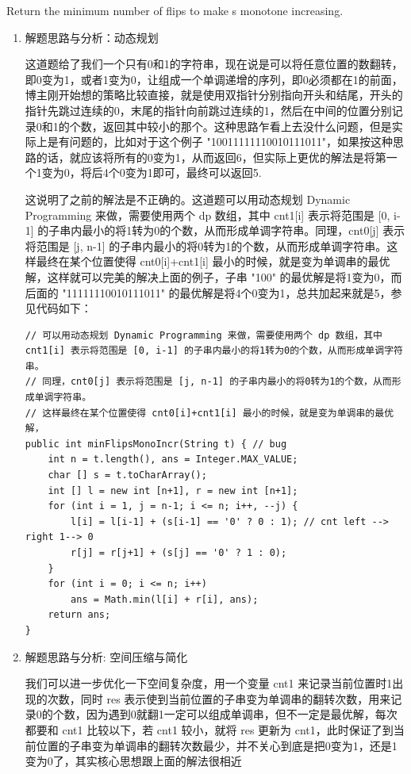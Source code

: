 \documentclass[9pt, b5paaper]{book}
\begin{document}
Return the minimum number of flips to make s monotone increasing.
\begin{enumerate}
\item 解题思路与分析：动态规划
\label{sec-1-4-23-1}

这道题给了我们一个只有0和1的字符串，现在说是可以将任意位置的数翻转，即0变为1，或者1变为0，让组成一个单调递增的序列，即0必须都在1的前面，博主刚开始想的策略比较直接，就是使用双指针分别指向开头和结尾，开头的指针先跳过连续的0，末尾的指针向前跳过连续的1，然后在中间的位置分别记录0和1的个数，返回其中较小的那个。这种思路乍看上去没什么问题，但是实际上是有问题的，比如对于这个例子 "10011111110010111011"，如果按这种思路的话，就应该将所有的0变为1，从而返回6，但实际上更优的解法是将第一个1变为0，将后4个0变为1即可，最终可以返回5.

这说明了之前的解法是不正确的。这道题可以用动态规划 Dynamic Programming 来做，需要使用两个 dp 数组，其中 cnt1[i] 表示将范围是 [0, i-1] 的子串内最小的将1转为0的个数，从而形成单调字符串。同理，cnt0[j] 表示将范围是 [j, n-1] 的子串内最小的将0转为1的个数，从而形成单调字符串。这样最终在某个位置使得 cnt0[i]+cnt1[i] 最小的时候，就是变为单调串的最优解，这样就可以完美的解决上面的例子，子串 "100" 的最优解是将1变为0，而后面的 "11111110010111011" 的最优解是将4个0变为1，总共加起来就是5，参见代码如下：

\begin{verbatim}
// 可以用动态规划 Dynamic Programming 来做，需要使用两个 dp 数组，其中 cnt1[i] 表示将范围是 [0, i-1] 的子串内最小的将1转为0的个数，从而形成单调字符串。
// 同理，cnt0[j] 表示将范围是 [j, n-1] 的子串内最小的将0转为1的个数，从而形成单调字符串。
// 这样最终在某个位置使得 cnt0[i]+cnt1[i] 最小的时候，就是变为单调串的最优解，
public int minFlipsMonoIncr(String t) { // bug
    int n = t.length(), ans = Integer.MAX_VALUE;
    char [] s = t.toCharArray();
    int [] l = new int [n+1], r = new int [n+1];
    for (int i = 1, j = n-1; i <= n; i++, --j) {
        l[i] = l[i-1] + (s[i-1] == '0' ? 0 : 1); // cnt left --> right 1--> 0
        r[j] = r[j+1] + (s[j] == '0' ? 1 : 0);
    }
    for (int i = 0; i <= n; i++) 
        ans = Math.min(l[i] + r[i], ans);
    return ans;
}
\end{verbatim}
\item 解题思路与分析: 空间压缩与简化
\label{sec-1-4-23-2}

我们可以进一步优化一下空间复杂度，用一个变量 cnt1 来记录当前位置时1出现的次数，同时 res 表示使到当前位置的子串变为单调串的翻转次数，用来记录0的个数，因为遇到0就翻1一定可以组成单调串，但不一定是最优解，每次都要和 cnt1 比较以下，若 cnt1 较小，就将 res 更新为 cnt1，此时保证了到当前位置的子串变为单调串的翻转次数最少，并不关心到底是把0变为1，还是1变为0了，其实核心思想跟上面的解法很相近


\end{enumerate}
\end{document}
